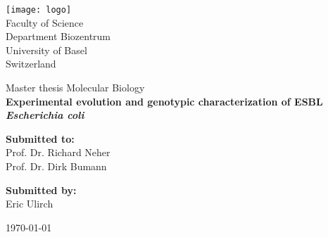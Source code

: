 \documentclass[12pt,twoside]{report}
\begin{document}
\begin{titlepage}
	\begin{center}
		\texttt{[image: logo]}\\
		\vspace{1cm}
		\Large
		Faculty of Science \\
		Department Biozentrum\\
		University of Basel\\
		Switzerland\\
		\date{\today}
		\vspace*{1cm}
		
		\Huge
		Master thesis Molecular Biology \\
		\vspace{2cm}
		\Huge
		\textbf{Experimental evolution and genotypic characterization of ESBL \textit{Escherichia coli}}
		
		\vspace{3cm}
		\begin{minipage}[t]{0.47\textwidth}
			\textnormal{\large{\bf Submitted to:\\}}
			{\large Prof. Dr. Richard Neher\\ Prof. Dr. Dirk Bumann}
		\end{minipage}\hfill\begin{minipage}[t]{0.47\textwidth}\raggedleft
			\textnormal{\large{\bf Submitted by:\\}}
			{\large Eric Ulirch}
		\end{minipage}			
		\vspace{3.5cm}
		\newline 
		\large{\today}

		
		
	\end{center}
\end{titlepage}
\end{document}
